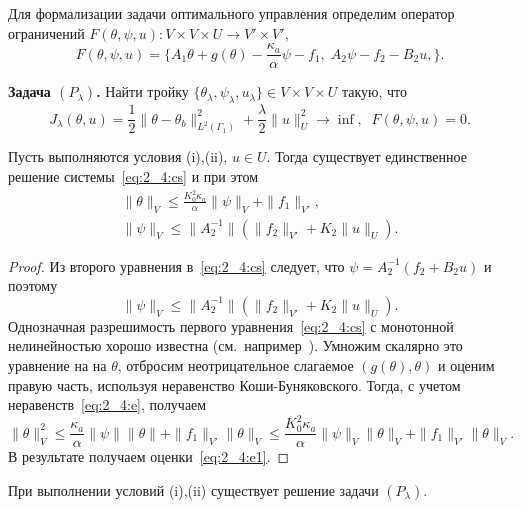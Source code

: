 Для формализации задачи оптимального управления определим оператор
ограничений $F(\theta, \psi, u) : V \times V \times U \rightarrow V' \times V'$,
\[
    F(\theta, \psi, u) = \{A_1\theta + g(\theta) - \frac{\kappa_a}{\alpha}\psi - f_1,\;
    A_2 \psi - f_2 - B_2 u, \}.
\]


\textbf{Задача $(P_\lambda)$.} Найти тройку
$\{\theta_\lambda, \psi_\lambda, u_\lambda \} \in V \times V \times U$
такую, что
\begin{equation}
    \label{eq:2_4:cp}
    J_\lambda(\theta, u) = \frac{1}{2}\|\theta -\theta_b\|^2_{L^2(\Gamma_1)}
    + \frac{\lambda}{2}\|u\|^2_U \rightarrow \inf,\;\; F(\theta, \psi, u) = 0.
\end{equation}


\begin{lemma}
    \label{lm:2_4:1}
    Пусть выполняются условия (i),(ii), $u\in U$.
    Тогда существует единственное решение системы~\eqref{eq:2_4:cs} и при этом
    \begin{equation}
        \label{eq:2_4:e1}
        \begin{aligned}
            \|\theta\|_V \leq
            \frac{K_0^2\kappa_a}{\alpha}\|\psi\|_V+\|f_1\|_{V'}, \\
            \|\psi\|_V\leq \|A_2^{-1}\| \left(\|f_2\|_{V'}+K_2\|u\|_U\right).
        \end{aligned}
    \end{equation}
\end{lemma}

\begin{proof}
    Из второго уравнения в~\eqref{eq:2_4:cs} следует, что $\psi = A_2^{-1}(f_2+B_2 u)$
    и поэтому
    \[
        \|\psi\|_V\leq \|A_2^{-1}\|\left(\|f_2\|_{V'}+K_2\|u\|_U\right).
    \]
    Однозначная разрешимость первого уравнения~\eqref{eq:2_4:cs} с монотонной
    нелинейностью хорошо известна (см.\ например~\cite{Kufner}).
    Умножим скалярно это уравнение на на $\theta$,
    отбросим неотрицательное слагаемое $(g(\theta),\theta)$ и оценим правую часть,
    используя неравенство Коши-Буняковского.
    Тогда, с учетом неравенств~\eqref{eq:2_4:e}, получаем
    \[
        \|\theta\|^2_V \leq \frac{\kappa_a}{\alpha}\|\psi\|\|\theta\|
        +\|f_1\|_{V'}\|\theta\|_V \leq
        \frac{K_0^2\kappa_a}{\alpha}\|\psi\|_V\|\theta\|_V
        +\|f_1\|_{V'}\|\theta\|_V.
    \]
    В результате получаем оценки~\eqref{eq:2_4:e1}.
\end{proof}


\begin{theorem}
    \label{th:2_4:1}
    При выполнении условий (i),(ii) существует решение задачи $(P_\lambda)$.
\end{theorem}


